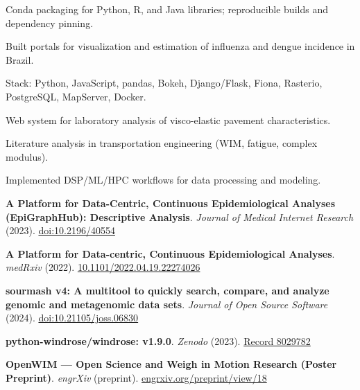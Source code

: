 \documentclass[10pt,a4paper]{article}
\begin{document}
\begin{tightitemize}
  \item Conda packaging for Python, R, and Java libraries; reproducible builds and dependency pinning.
\end{tightitemize}

\begin{tightitemize}
  \item Built portals for visualization and estimation of influenza and dengue incidence in Brazil.
  \item Stack: Python, JavaScript, pandas, Bokeh, Django/Flask, Fiona, Rasterio, PostgreSQL, MapServer, Docker.
\end{tightitemize}

\begin{tightitemize}
  \item Web system for laboratory analysis of visco-elastic pavement characteristics.
\end{tightitemize}

\begin{tightitemize}
  \item Literature analysis in transportation engineering (WIM, fatigue, complex modulus).
  \item Implemented DSP/ML/HPC workflows for data processing and modeling.
\end{tightitemize}

\begin{tightitemize}
  \item \textbf{A Platform for Data-Centric, Continuous Epidemiological Analyses (EpiGraphHub): Descriptive Analysis}. \emph{Journal of Medical Internet Research} (2023). \href{https://www.jmir.org/2023/1/e40554/}{doi:10.2196/40554}
  \item \textbf{A Platform for Data-centric, Continuous Epidemiological Analyses}. \emph{medRxiv} (2022). \href{https://www.medrxiv.org/content/10.1101/2022.04.19.22274026v2}{10.1101/2022.04.19.22274026}
  \item \textbf{sourmash v4: A multitool to quickly search, compare, and analyze genomic and metagenomic data sets}. \emph{Journal of Open Source Software} (2024). \href{https://joss.theoj.org/papers/10.21105/joss.06830}{doi:10.21105/joss.06830}
  \item \textbf{python-windrose/windrose: v1.9.0}. \emph{Zenodo} (2023). \href{https://zenodo.org/records/8029782}{Record 8029782}
  \item \textbf{OpenWIM — Open Science and Weigh in Motion Research (Poster Preprint)}. \emph{engrXiv} (preprint). \href{https://engrxiv.org/preprint/view/18}{engrxiv.org/preprint/view/18}
\end{tightitemize}
\end{document}

